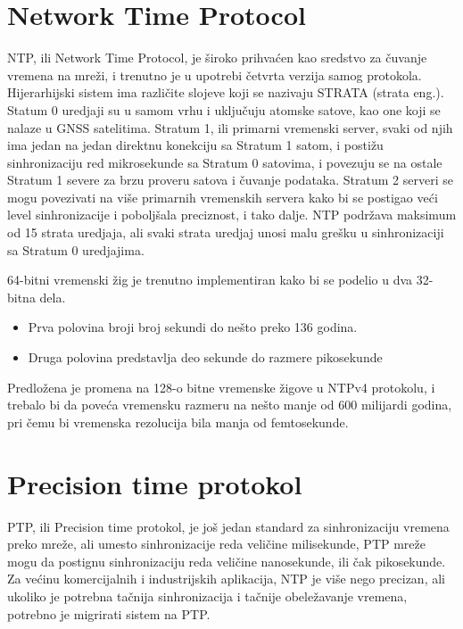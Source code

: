 \documentclass[a4paper,12pt, master]{etf}
\begin{document}
	\section{Network Time Protocol}

	NTP, ili Network Time Protocol, je \v{s}iroko prihva\'{c}en kao sredstvo za 
	\v{c}uvanje vremena na mre\v{z}i, i trenutno je u upotrebi \v{c}etvrta 
	verzija samog protokola. Hijerarhijski sistem ima razli\v{c}ite slojeve 
	koji se nazivaju STRATA (strata eng.). Statum 0	uredjaji su u samom vrhu i 
	uklju\v{c}uju atomske satove, kao one koji se nalaze u GNSS	satelitima.	
	Stratum 1, ili primarni vremenski server, svaki od njih ima jedan na jedan
	direktnu konekciju sa Stratum 1 satom, i posti\v{z}u sinhronizaciju red 
	mikrosekunde sa Stratum	0 satovima, i povezuju se na ostale Stratum 1 
	severe za brzu proveru satova i \v{c}uvanje	podataka. Stratum 2 serveri se 
	mogu povezivati na vi\v{s}e primarnih vremenskih servera kako bi se 
	postigao ve\'{c}i level sinhronizacije i pobolj\v{s}ala preciznost, i tako 
	dalje. NTP podr\v{z}ava maksimum od 15 strata uredjaja, ali svaki strata 
	uredjaj unosi malu gre\v{s}ku u	sinhronizaciji sa Stratum 0 uredjajima.

	64-bitni vremenski \v{z}ig je trenutno implementiran kako bi se podelio u 
	dva 32-bitna dela.
	\begin{itemize}
		\item Prva polovina broji broj sekundi do ne\v{s}to preko 136 godina.
		\item Druga polovina predstavlja deo sekunde do razmere pikosekunde
	\end{itemize}

	Predlo\v{z}ena je promena na 128-o bitne vremenske \v{z}igove u NTPv4 
	protokolu, i trebalo bi da pove\'{c}a vremensku razmeru na ne\v{s}to manje 
	od 600 milijardi godina, pri \v{c}emu bi vremenska rezolucija bila manja od 
	femtosekunde.

	\section{Precision time protokol}

	PTP, ili Precision time protokol, je jo\v{s} jedan standard za 
	sinhronizaciju vremena preko mre\v{z}e, ali umesto sinhronizacije reda 
	veli\v{c}ine milisekunde, PTP mre\v{z}e mogu da postignu sinhronizaciju 
	reda veli\v{c}ine nanosekunde, ili \v{c}ak pikosekunde. Za ve\'{c}inu 
	komercijalnih i	industrijskih aplikacija, NTP je vi\v{s}e nego precizan, 
	ali ukoliko je potrebna ta\v{c}nija	sinhronizacija i ta\v{c}nije 
	obele\v{z}avanje vremena, potrebno je migrirati sistem na PTP.
\end{document}
